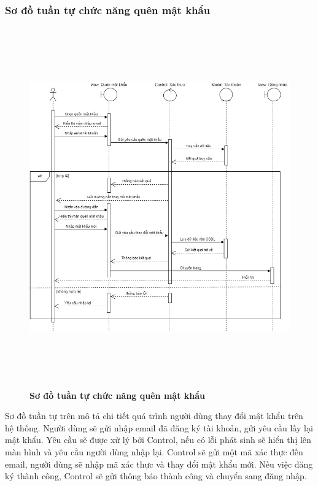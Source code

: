 \subsubsection{Sơ đồ tuần tự chức năng quên mật khẩu}
\begin{figure}[H]
  \centering
  \includegraphics[width=15cm,height=15.5cm]{Images/sequence/sequence_forgot_password.png}
  \caption[Sơ đồ tuần tự chức năng quên mật khẩu]{\bfseries \fontsize{12pt}{0pt}
  \selectfont Sơ đồ tuần tự chức năng quên mật khẩu}
  \label{sequence_forgot_pass} %
\end{figure}
Sơ đồ tuần tự trên mô tả chi tiết quá trình người dùng thay đổi mật khẩu trên hệ thống. Người dùng sẽ gửi nhập email đã đăng ký tài khoản, gửi yêu cầu
lấy lại mật khẩu. Yêu cầu sẽ được xử lý bởi Control, nếu có lỗi phát sinh sẽ hiển thị lên màn hình và yêu cầu người dùng nhập lại. Control sẽ gửi một mã xác thực
đến email, người dùng sẽ nhập mã xác thực và thay đổi mật khẩu mới. Nếu việc đăng ký thành công,
Control sẽ gửi thông báo thành công và chuyển sang đăng nhập.

